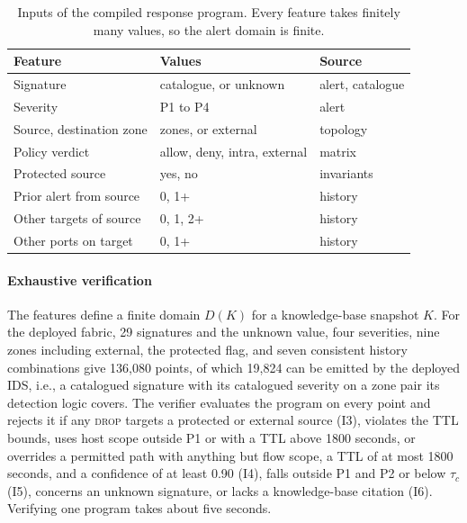 \documentclass[final,5p]{elsarticle}
\begin{document}
\begin{table}[tbp]
    \centering
    \caption{Inputs of the compiled response program. Every feature takes finitely many values, so the alert domain is finite.}
    \label{tab:program_inputs}
    \small
    \setlength{\tabcolsep}{4pt}
    \begin{tabular}{@{}lll@{}}
        \toprule
        \textbf{Feature} & \textbf{Values} & \textbf{Source} \\
        \midrule
        Signature & catalogue, or unknown & alert, catalogue \\
        Severity & P1 to P4 & alert \\
        Source, destination zone & zones, or external & topology \\
        Policy verdict & allow, deny, intra, external & matrix \\
        Protected source & yes, no & invariants \\
        Prior alert from source & 0, 1+ & history \\
        Other targets of source & 0, 1, 2+ & history \\
        Other ports on target & 0, 1+ & history \\
        \bottomrule
    \end{tabular}
\end{table}

\paragraph{Exhaustive verification}
The features define a finite domain $D(K)$ for a knowledge-base snapshot $K$. For the deployed fabric, 29 signatures and the unknown value, four severities, nine zones including external, the protected flag, and seven consistent history combinations give 136,080 points, of which 19,824 can be emitted by the deployed IDS, i.e., a catalogued signature with its catalogued severity on a zone pair its detection logic covers. The verifier evaluates the program on every point and rejects it if any \textsc{drop} targets a protected or external source (I3), violates the TTL bounds, uses host scope outside P1 or with a TTL above 1800 seconds, or overrides a permitted path with anything but flow scope, a TTL of at most 1800 seconds, and a confidence of at least 0.90 (I4), falls outside P1 and P2 or below $\tau_c$ (I5), concerns an unknown signature, or lacks a knowledge-base citation (I6). Verifying one program takes about five seconds.
\end{document}
